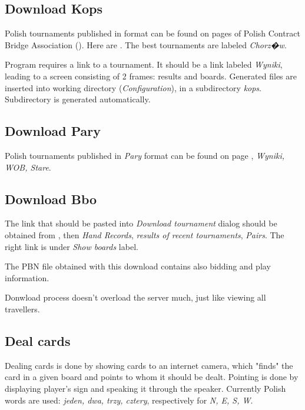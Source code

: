 \documentclass[polish,a4paper,11pt,oneside]{article}
\begin{document}
\subsection{Download Kops} \label{pobKops}

Polish tournaments published in 
format can be found on pages of Polish Contract Bridge Association
().
Here are .
The best tournaments are labeled {\em Chorz�w}.

Program requires a link to a tournament.
It should be a link labeled {\em Wyniki},
leading to a screen consisting of 2 frames: results and boards.
Generated files are inserted into working directory ({\em Configuration}),
in a subdirectory {\em kops}. Subdirectory is generated automatically.

\subsection{Download Pary} \label{pobPary}

Polish tournaments published in {\em Pary}
format can be found on page
,
{\em Wyniki, WOB, Stare}.

\subsection{Download Bbo} \label{pobBbo}
The link that should be pasted into {\em Download tournament} dialog
should be obtained from \bbolonglink, then {\em Hand Records}, 
{\em results of recent tournaments}, {\em Pairs}.
The right link is under {\em Show boards} label.

The PBN file obtained with this download contains also bidding and play
information.

Donwload process doesn't overload the server much, just like viewing
all travellers.

\subsection{Deal cards} \label{rozdaj}

Dealing cards is done by showing cards to an internet camera,
which "finds" the card in a given board and points to whom it should be dealt.
Pointing is done by displaying player's sign and speaking it through the speaker.
Currently Polish words are used: {\em jeden, dwa, trzy, cztery},
respectively for {\em N, E, S, W}. %
\end{document}
